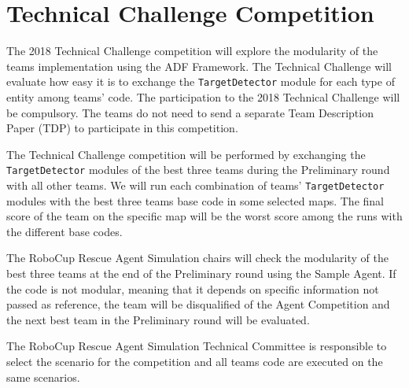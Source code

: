 \documentclass{article}
\begin{document}
\section{Technical Challenge Competition}
\label{sec:technical}
The 2018 Technical Challenge competition will explore the modularity of the 
teams implementation using the ADF Framework. The Technical Challenge will 
evaluate how easy it is to exchange the \texttt{TargetDetector} module for each 
type of entity among teams' code. The participation to the 2018 Technical 
Challenge will be compulsory. The teams do not need to send a separate Team 
Description Paper (TDP) to participate in this competition.

The Technical Challenge competition will be performed by exchanging the
\texttt{TargetDetector} modules of the best three teams during the Preliminary
round with all other teams. We will run each combination of teams'
\texttt{TargetDetector} modules with the best three teams base code in some
selected maps. The final score of the team on the specific map will be the worst
score among the runs with the different base codes.

The RoboCup Rescue Agent Simulation chairs will check the modularity of the 
best three teams at the end of the Preliminary round using the Sample Agent. If
the code is not modular, meaning that it depends on specific information not
passed as reference, the team will be disqualified of the Agent Competition and
the next best team in the Preliminary round will be evaluated.

The RoboCup Rescue Agent Simulation Technical Committee is responsible to 
select the scenario for the competition and all teams code are executed on the 
same scenarios.
\end{document}
